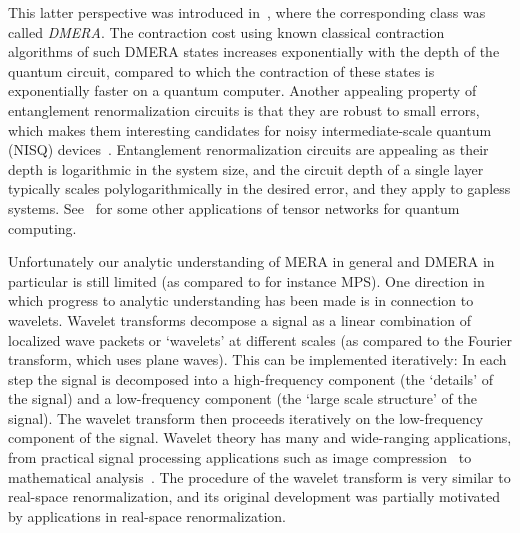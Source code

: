 \documentclass[submission, Phys]{SciPost}
\theoremstyle{definition}
\theoremstyle{remark}
\newcommand{\change}[1]{#1}
\begin{document}
This latter perspective was introduced in~\cite{kim2017robust}, \change{where the corresponding class was called \emph{DMERA}.
The contraction cost using known classical contraction algorithms of such DMERA states increases exponentially with the depth of the quantum circuit, compared to which the contraction of these states is exponentially faster on a quantum computer.
Another appealing property of entanglement renormalization circuits is that they are robust to small errors, which makes them interesting candidates for noisy intermediate-scale quantum (NISQ) devices~\cite{kim2017robust,preskill2018quantum}.}
Entanglement renormalization circuits are appealing as their depth is logarithmic in the system size, and the circuit depth of a single layer typically scales polylogarithmically in the desired error, and they apply to gapless systems.
See~\cite{huggins2019towards,zhou2020limits} for some other applications of tensor networks for quantum computing.

Unfortunately our analytic understanding of MERA in general and DMERA in particular is still limited (as compared to for instance MPS).
One direction in which progress to analytic understanding has been made is in connection to wavelets.
\change{Wavelet transforms decompose a signal as a linear combination of localized wave packets or `wavelets' at different scales (as compared to the Fourier transform, which uses plane waves).
This can be implemented iteratively:
In each step the signal is decomposed into a high-frequency component (the `details' of the signal) and a low-frequency component (the `large scale structure' of the signal).
The wavelet transform then proceeds iteratively on the low-frequency component of the signal.
Wavelet theory has many and wide-ranging applications, from practical signal processing applications such as image compression~\cite{mallat2008wavelet} to mathematical analysis~\cite{meyer1992wavelets}.
The procedure of the wavelet transform is very similar to real-space renormalization, and its original development was partially motivated by applications in real-space renormalization.}
\end{document}
